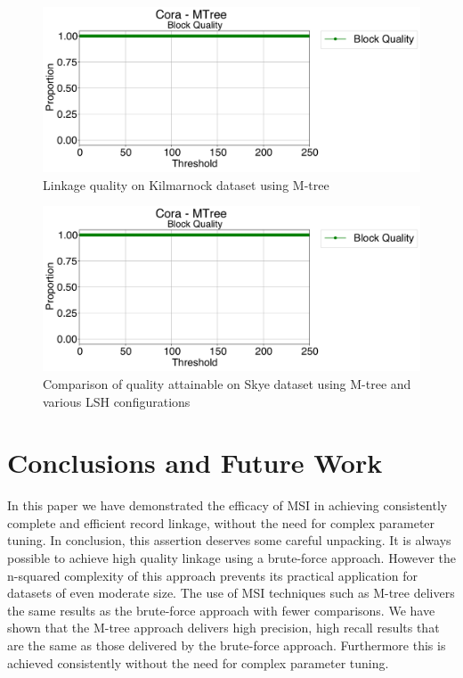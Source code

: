 \documentclass{llncs}
\begin{document}
\begin{figure}
\includegraphics[width=\textwidth]{figures/plotBQ_--_Cora_-_MTree}
\caption{Linkage quality on Kilmarnock dataset using M-tree\label{kilmarnock-quality-mtree}}
\end{figure}

\begin{figure}
\includegraphics[width=\textwidth]{figures/plotBQ_--_Cora_-_MTree}
\caption{Comparison of quality attainable on Skye dataset using M-tree and various LSH configurations\label{mtree-lsh-quality}}
\end{figure}


\section{Conclusions and Future Work\label{sec-concl}}

In this paper we have demonstrated the efficacy of MSI in achieving consistently complete and efficient record linkage, without the need for complex parameter tuning. In conclusion, this assertion deserves some careful unpacking. It is always possible to achieve high quality linkage using a brute-force approach. However the n-squared complexity of this approach prevents its practical application for datasets of even moderate size. The use of MSI techniques such as M-tree delivers the same results as the brute-force approach with fewer comparisons. We have shown that the M-tree approach delivers high precision, high recall results that are the same as those delivered by the brute-force approach. Furthermore this is achieved consistently without the need for complex parameter tuning.
\end{document}
